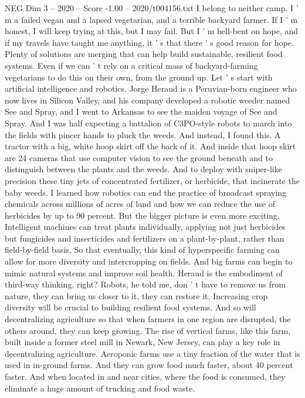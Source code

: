 \begin{textsample}{NEG Dim 3 – 2020 – Score -1.00 – 2020/t004156.txt}
I belong to neither camp.
I ' m a failed vegan and a lapsed vegetarian, and a terrible backyard farmer.
If I ' m honest, I will keep trying at this, but I may fail.
But I ' m hell-bent on hope, and if my travels have taught me anything, it ' s that there ' s good reason for hope.
Plenty of solutions are merging that can help build sustainable, resilient food systems.
Even if we can ' t rely on a critical mass of backyard-farming vegetarians to do this on their own, from the ground up.
Let ' s start with artificial intelligence and robotics.
Jorge Heraud is a Peruvian-born engineer who now lives in Silicon Valley, and his company developed a robotic weeder named See and Spray, and I went to Arkansas to see the maiden voyage of See and Spray.
And I was half expecting a battalion of C3PO-style robots to march into the fields with pincer hands to pluck the weeds.
And instead, I found this.
A tractor with a big, white hoop skirt off the back of it.
And inside that hoop skirt are 24 cameras that use computer vision to see the ground beneath and to distinguish between the plants and the weeds.
And to deploy with sniper-like precision these tiny jets of concentrated fertilizer, or herbicide, that incinerate the baby weeds.
I learned how robotics can end the practice of broadcast spraying chemicals across millions of acres of land and how we can reduce the use of herbicides by up to 90 percent.
But the bigger picture is even more exciting.
Intelligent machines can treat plants individually, applying not just herbicides but fungicides and insecticides and fertilizers on a plant-by-plant, rather than field-by-field basis.
So that eventually, this kind of hyperspecific farming can allow for more diversity and intercropping on fields.
And big farms can begin to mimic natural systems and improve soil health.
Heraud is the embodiment of third-way thinking, right?
Robots, he told me, don ' t have to remove us from nature, they can bring us closer to it, they can restore it.
Increasing crop diversity will be crucial to building resilient food systems.
And so will decentralizing agriculture so that when farmers in one region are disrupted, the others around, they can keep growing.
The rise of vertical farms, like this farm, built inside a former steel mill in Newark, New Jersey, can play a key role in decentralizing agriculture.
Aeroponic farms use a tiny fraction of the water that is used in in-ground farms.
And they can grow food much faster, about 40 percent faster.
And when located in and near cities, where the food is consumed, they eliminate a huge amount of trucking and food waste.

\end{textsample}
